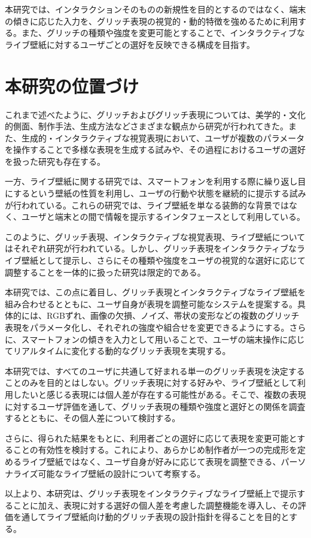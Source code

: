 本研究では、インタラクションそのものの新規性を目的とするのではなく、端末の傾きに応じた入力を、グリッチ表現の視覚的・動的特徴を強めるために利用する。また、グリッチの種類や強度を変更可能とすることで、インタラクティブなライブ壁紙に対するユーザごとの選好を反映できる構成を目指す。



\section{本研究の位置づけ}

これまで述べたように、グリッチおよびグリッチ表現については、美学的・文化的側面、制作手法、生成方法などさまざまな観点から研究が行われてきた。また、生成的・インタラクティブな視覚表現において、ユーザが複数のパラメータを操作することで多様な表現を生成する試みや、その過程におけるユーザの選好を扱った研究も存在する\cite{parikh2020preferences,interactiveArtEngagement}。

一方、ライブ壁紙に関する研究では、スマートフォンを利用する際に繰り返し目にするという壁紙の性質を利用し、ユーザの行動や状態を継続的に提示する試みが行われている。これらの研究では、ライブ壁紙を単なる装飾的な背景ではなく、ユーザと端末との間で情報を提示するインタフェースとして利用している。

このように、グリッチ表現、インタラクティブな視覚表現、ライブ壁紙についてはそれぞれ研究が行われている。しかし、グリッチ表現をインタラクティブなライブ壁紙として提示し、さらにその種類や強度をユーザの視覚的な選好に応じて調整することを一体的に扱った研究は限定的である。

本研究では、この点に着目し、グリッチ表現とインタラクティブなライブ壁紙を組み合わせるとともに、ユーザ自身が表現を調整可能なシステムを提案する。具体的には、RGBずれ、画像の欠損、ノイズ、帯状の変形などの複数のグリッチ表現をパラメータ化し、それぞれの強度や組合せを変更できるようにする。さらに、スマートフォンの傾きを入力として用いることで、ユーザの端末操作に応じてリアルタイムに変化する動的なグリッチ表現を実現する。

本研究では、すべてのユーザに共通して好まれる単一のグリッチ表現を決定することのみを目的とはしない。グリッチ表現に対する好みや、ライブ壁紙として利用したいと感じる表現には個人差が存在する可能性がある。そこで、複数の表現に対するユーザ評価を通して、グリッチ表現の種類や強度と選好との関係を調査するとともに、その個人差について検討する。

さらに、得られた結果をもとに、利用者ごとの選好に応じて表現を変更可能とすることの有効性を検討する。これにより、あらかじめ制作者が一つの完成形を定めるライブ壁紙ではなく、ユーザ自身が好みに応じて表現を調整できる、パーソナライズ可能なライブ壁紙の設計について考察する。

以上より、本研究は、グリッチ表現をインタラクティブなライブ壁紙上で提示することに加え、表現に対する選好の個人差を考慮した調整機能を導入し、その評価を通してライブ壁紙向け動的グリッチ表現の設計指針を得ることを目的とする。